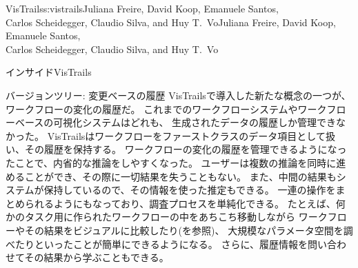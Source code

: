 \begin{aosachaptertoc}{VisTrails}{s:vistrails}{Juliana Freire, David Koop, Emanuele Santos, \\ Carlos Scheidegger, Claudio Silva, and Huy T.\ Vo}{Juliana Freire, David Koop, Emanuele Santos, \\ \hspace*{0.9cm} Carlos Scheidegger, Claudio Silva, and Huy T.\ Vo}
\begin{aosasect1}{インサイドVisTrails}
\begin{aosasect2}{バージョンツリー: 変更ベースの履歴}
VisTrailsで導入した新たな概念の一つが、ワークフローの変化の履歴だ\cite{bib:freire:vistrails}。
これまでのワークフローシステムやワークフローベースの可視化システムはどれも、
生成されたデータの履歴しか管理できなかった。
VisTrailsはワークフローをファーストクラスのデータ項目として扱い、その履歴を保持する。
ワークフローの変化の履歴を管理できるようになったことで、内省的な推論をしやすくなった。
ユーザーは複数の推論を同時に進めることができ、その際に一切結果を失うこともない。
また、中間の結果もシステムが保持しているので、その情報を使った推定もできる。
一連の操作をまとめられるようにもなっており、調査プロセスを単純化できる。
たとえば、何かのタスク用に作られたワークフローの中をあちこち移動しながら
ワークフローやその結果をビジュアルに比較したり(を参照)、
大規模なパラメータ空間を調べたりといったことが簡単にできるようになる。
さらに、履歴情報を問い合わせてその結果から学ぶこともできる。


\end{aosasect2}
\end{aosasect1}
\end{aosachaptertoc}
